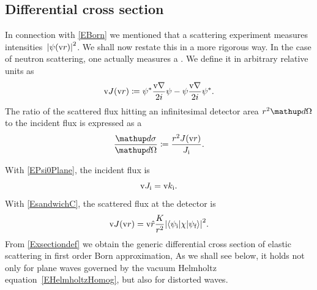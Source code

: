 %


\subsection{Differential cross section}\label{SdiffCross}

In connection with \cref{EBorn} we mentioned
that a scattering experiment measures intensities~${|\psi(\text{v}{r})|}^2$.
We shall now restate this in a more rigorous way.
In the case of neutron scattering,
one actually measures a .
We define it in arbitrary relative units as
\begin{equation}\label{EdefJ}
  \text{v}{J}(\text{v}{r}) \coloneqq  \psi^*\frac{\text{v}{\nabla}}{2i}\psi - \psi\frac{\text{v}{\nabla}}{2i}\psi^*.
\end{equation}
%
The ratio of the scattered flux hitting an infinitesimal detector area
$r^2\d\Omega$ to the incident flux is expressed as a
%
\begin{equation}\label{Exsectiondef}
  \frac{\d\sigma}{\d\Omega}
  \coloneqq  \frac{r^2 J(\r)}{J_\ti}.
\end{equation}
%
%

With \cref{EPsi0Plane}, the incident flux is
\begin{equation}\label{EJi}
  \text{v}{J}_{\text{i}} = \text{v}{k}_{\text{i}}.
\end{equation}
With \cref{EsandwichC}, the scattered flux at the detector is
\begin{equation}\label{EJr}
  \text{v}{J}(\text{v}{r})
  = \text{v}{\hat r}\frac{K}{r^2}
    {\left|\left\langle\psi_{\text{i}}|\chi|\psi_{\text{f}}\right\rangle\right|}^2.
\end{equation}
From \cref{Exsectiondef} we obtain
the generic differential cross section
of elastic scattering in first order Born approximation,
As we shall see below,
it holds not only for plane waves governed
by the vacuum Helmholtz equation~\cref{EHelmholtzHomog},
but also for distorted waves.

